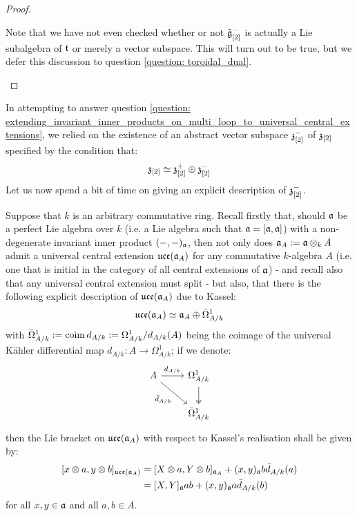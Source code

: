 \begin{proof}
\begin{enumerate}
                    Note that we have not even checked whether or not $\tilde{\mathfrak{g}}_{[2]}^-$ is actually a Lie subalgebra of $\mathfrak{t}$ or merely a vector subspace. This will turn out to be true, but we defer this discussion to question \ref{question: toroidal_dual}. 
                \end{enumerate}
            \end{proof}
        \begin{remark} \label{remark: centres_of_dual_toroidal_lie_algebras}
            In attempting to answer question \ref{question: extending_invariant_inner_products_on_multi_loop_to_universal_central_extensions}, we relied on the existence of an abstract vector subspace $\mathfrak{z}_{[2]}^-$ of $\mathfrak{z}_{[2]}$ specified by the condition that:
                $$\mathfrak{z}_{[2]} \simeq \mathfrak{z}_{[2]}^+ \oplus \mathfrak{z}_{[2]}^-$$
            Let us now spend a bit of time on giving an explicit description of $\mathfrak{z}_{[2]}^-$. 

            Suppose that $k$ is an arbitrary commutative ring. Recall firstly that, should $\mathfrak{a}$ be a perfect Lie algebra over $k$ (i.e. a Lie algebra such that $\mathfrak{a} = [\mathfrak{a}, \mathfrak{a}]$) with a non-degenerate invariant inner product $(-, -)_{\mathfrak{a}}$, then not only does $\a_A := \a \tensor_k A$ admit a universal central extension $\mathfrak{uce}(\mathfrak{a}_A)$ for any commutative $k$-algebra $A$ (i.e. one that is initial in the category of all central extensions of $\mathfrak{a}$) - and recall also that any universal central extension must split - but also, that there is the following explicit description of $\mathfrak{uce}(\mathfrak{a}_A)$ due to Kassel:
                $$\mathfrak{uce}(\mathfrak{a}_A) \simeq \mathfrak{a}_A \oplus \bar{\Omega}^1_{A/k}$$
            with $\bar{\Omega}^1_{A/k} := \operatorname{coim} d_{A/k} := \Omega^1_{A/k}/d_{A/k}(A)$ being the coimage of the universal K\"ahler differential map $d_{A/k}: A \to \Omega^1_{A/k}$; if we denote:
                $$
                    \begin{tikzcd}
                    A & {\Omega^1_{A/k}} \\
                    & {\bar{\Omega}^1_{A/k}}
                    \arrow[two heads, from=1-2, to=2-2]
                    \arrow["{d_{A/k}}", from=1-1, to=1-2]
                    \arrow["{\bar{d}_{A/k}}"', from=1-1, to=2-2]
                    \end{tikzcd}
                $$
            then the Lie bracket on $\mathfrak{uce}(\mathfrak{a}_A)$ with respect to Kassel's realisation shall be given by:
                $$
                    \begin{aligned}
                        [ x \tensor a, y \tensor b ]_{\uce(\a_A)} & = [ X \tensor a, Y \tensor b ]_{\a_A} + (x, y)_{\a} b \bar{d}_{A/k}(a)
                        \\
                        & = [X, Y]_{\a} ab + (x, y)_{\a} a \bar{d}_{A/k}(b)
                    \end{aligned}
                $$
            for all $x, y \in \mathfrak{a}$ and all $a, b \in A$.


\end{remark}
